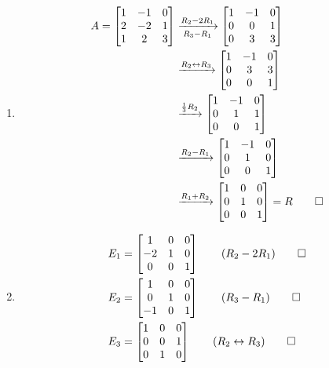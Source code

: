 \documentclass[12pt, a4paper]{article}
\begin{document}
\begin{enumerate}[Q\arabic*.]
    \begin{enumerate}[label=(c\roman*)]
      \item \begin{align*}
          A = \begin{bmatrix}1&-1&0\\2&-2&1\\1&2&3\end{bmatrix} &\xrightarrow[R_3-R_1]{R_2-2R_1}
          \begin{bmatrix}1&-1&0\\0&0&1\\0&3&3\end{bmatrix} \\&\xrightarrow{R_2\leftrightarrow R_3} \begin{bmatrix}1&-1&0\\0&3&3\\0&0&1\end{bmatrix}\\&\xrightarrow{\frac{1}{3}R_2}
          \begin{bmatrix}1&-1&0\\0&1&1\\0&0&1\end{bmatrix}\\&\xrightarrow{R_2-R_1}
          \begin{bmatrix}1&-1&0\\0&1&0\\0&0&1\end{bmatrix}\\&\xrightarrow{R_1+R_2}
          \begin{bmatrix}1&0&0\\0&1&0\\0&0&1\end{bmatrix} = R \qed
        \end{align*}
      \item \begin{align*}
          E_1 &= \begin{bmatrix}1&0&0\\-2&1&0\\0&0&1\end{bmatrix}\tag*{($R_2-2R_1$)} \qed\\
          E_2 &= \begin{bmatrix}1&0&0\\0&1&0\\-1&0&1\end{bmatrix}\tag*{($R_3-R_1$)} \qed\\
          E_3 &= \begin{bmatrix}1&0&0\\0&0&1\\0&1&0\end{bmatrix}\tag*{($R_2\leftrightarrow R_3$)} \qed\\

\end{align*}
\end{enumerate}
\end{enumerate}
\end{document}
